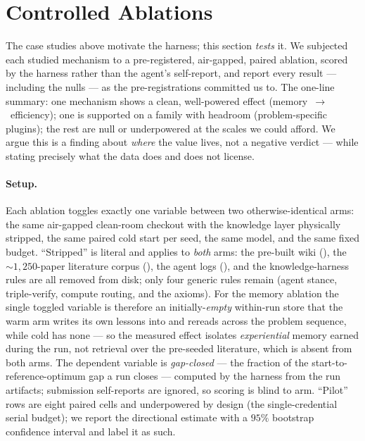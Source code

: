 \documentclass[11pt]{article}
\begin{document}
\section{Controlled Ablations}
\label{sec:ablations}

The case studies above motivate the harness; this section \emph{tests} it. We subjected each
studied mechanism to a pre-registered, air-gapped, paired ablation, scored by the harness
rather than the agent's self-report, and report every result --- including the nulls --- as the
pre-registrations committed us to. The one-line summary: one mechanism shows a clean,
well-powered effect (memory~$\to$~efficiency); one is supported on a family with headroom
(problem-specific plugins); the rest are null or underpowered at the scales we could afford. We
argue this is a finding about \emph{where} the value lives, not a negative verdict --- while
stating precisely what the data does and does not license.

\paragraph{Setup.}
Each ablation toggles exactly one variable between two otherwise-identical arms: the same
air-gapped clean-room checkout with the knowledge layer physically stripped, the same paired
cold start per seed, the same model, and the same fixed budget. ``Stripped'' is literal and
applies to \emph{both} arms: the pre-built wiki (), the ${\sim}1{,}250$-paper
literature corpus (), the agent logs (), and the
knowledge-harness rules are all removed from disk; only four generic rules remain (agent
stance, triple-verify, compute routing, and the axioms). For the memory ablation the single
toggled variable is therefore an initially-\emph{empty} within-run store that the warm arm
writes its own lessons into and rereads across the problem sequence, while cold has none --- so
the measured effect isolates \emph{experiential} memory earned during the run, not retrieval
over the pre-seeded literature, which is absent from both arms. The dependent variable is
\emph{gap-closed} --- the fraction of the start-to-reference-optimum gap a run closes ---
computed by the harness from the run artifacts; submission self-reports are ignored, so
scoring is blind to arm. ``Pilot'' rows are eight paired
cells and underpowered by design (the single-credential serial budget); we report the
directional estimate with a $95\%$ bootstrap confidence interval and label it as such.
\end{document}
